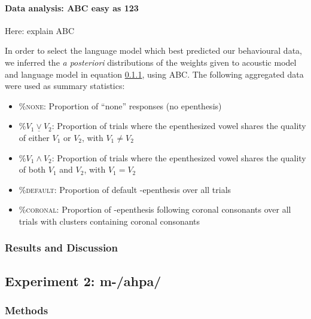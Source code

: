 \paragraph{Data analysis: ABC easy as 123}

{\color{red}Here: explain ABC}

In order to select the language model which best predicted our behavioural data, we inferred the \textit{a posteriori} distributions of the weights given to acoustic model and language model in {\color{red}equation \ref{}}, using ABC. The following aggregated data were used as summary statistics:

\begin{itemize}
\item \textsc{\%none}: Proportion of ``none'' responses (no epenthesis)
\item \textsc{\%$V_{1}\underline{\vee}V_{2}$}: Proportion of trials where the epenthesized vowel shares the quality of either $V_{1}$ or $V_{2}$, with $V_{1} \neq V_{2}$
\item \textsc{\%$V_{1}\land V_{2}$}: Proportion of trials where the epenthesized vowel shares the quality of both $V_{1}$ and $V_{2}$, with $V_{1} = V_{2}$
\item \textsc{\%default}: Proportion of default -epenthesis over all trials
\item \textsc{\%coronal}: Proportion of -epenthesis following coronal consonants over all trials with clusters containing coronal consonants 
\end{itemize} 

\subsubsection{Results and Discussion}
\subsection{Experiment 2: {\color{red}m-/ahpa/}}
\subsubsection{Methods}

